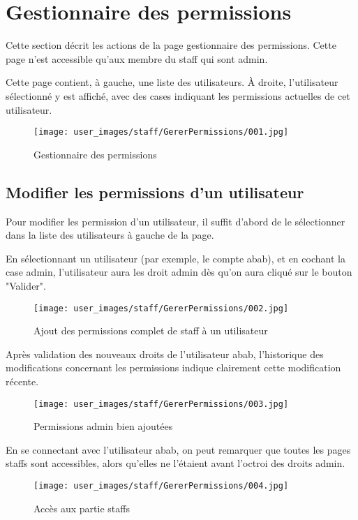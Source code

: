 \section{Gestionnaire des permissions}

Cette section décrit les actions de la page gestionnaire des permissions. Cette page n'est accessible qu'aux membre du staff qui sont admin.\newline

Cette page contient, à gauche, une liste des utilisateurs. À droite, l'utilisateur sélectionné y est affiché, avec des cases indiquant les permissions actuelles de cet utilisateur.

\begin{figure}[H]
\centering
\texttt{[image: user\_images/staff/GererPermissions/001.jpg]}
\caption{Gestionnaire des permissions}
\end{figure}

\subsection{Modifier les permissions d'un utilisateur}

Pour modifier les permission d'un utilisateur, il suffit d'abord de le sélectionner dans la liste des utilisateurs à gauche de la page.\newline

En sélectionnant un utilisateur (par exemple, le compte abab), et en cochant la case admin, l'utilisateur aura les droit admin dès qu'on aura cliqué sur le bouton "Valider".

\begin{figure}[H]
\centering
\texttt{[image: user\_images/staff/GererPermissions/002.jpg]}
\caption{Ajout des permissions complet de staff à un utilisateur}
\end{figure}

Après validation des nouveaux droits de l'utilisateur abab, l'historique des modifications concernant les permissions indique clairement cette modification récente.

\begin{figure}[H]
\centering
\texttt{[image: user\_images/staff/GererPermissions/003.jpg]}
\caption{Permissions admin bien ajoutées}
\end{figure}

En se connectant avec l'utilisateur abab, on peut remarquer que toutes les pages staffs sont accessibles, alors qu'elles ne l'étaient avant l'octroi des droits admin.

\begin{figure}[H]
\centering
\texttt{[image: user\_images/staff/GererPermissions/004.jpg]}
\caption{Accès aux partie staffs}
\end{figure}